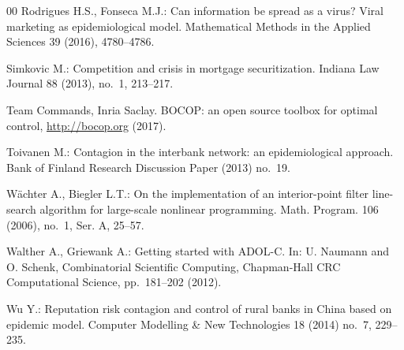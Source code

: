 \documentclass[a4paper,10pt,twoside]{article}
\begin{document}
\begin{thebibliography}{00}
\bibitem{[10]}
Rodrigues H.S., Fonseca M.J.:
Can information be spread as a virus? Viral marketing as epidemiological model. 
Mathematical Methods in the Applied Sciences 39 (2016), 4780--4786.

\bibitem{[22]}
Simkovic M.:
Competition and crisis in mortgage securitization.
Indiana Law Journal 88 (2013), no.~1, 213--217.

Team Commands, Inria Saclay.
BOCOP: an open source toolbox for optimal control,
\url{http://bocop.org} (2017).

\bibitem{[13]}
Toivanen M.: 
Contagion in the interbank network: an epidemiological approach. 
Bank of Finland Research Discussion Paper (2013) no.~19.

W\"achter A., Biegler L.T.: 
On the implementation of an interior-point filter line-search 
algorithm for large-scale nonlinear programming. 
Math. Program. 106 (2006), no.~1, Ser. A, 25--57. 

Walther A., Griewank A.: 
Getting started with ADOL-C. 
In: U. Naumann and O. Schenk, 
Combinatorial Scientific Computing, 
Chapman-Hall CRC Computational Science, pp.~181--202 (2012). 
 
\bibitem{[12]}
Wu Y.: 
Reputation risk contagion and control of rural banks in China based on epidemic model.
Computer Modelling \& New Technologies 18 (2014) no.~7, 229--235.
    	
\end{thebibliography}  	

\end{document}
